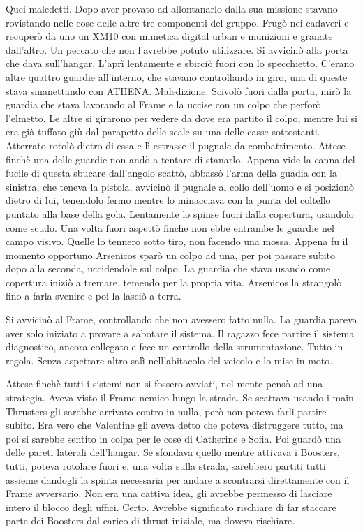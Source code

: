     Quei maledetti. Dopo aver provato ad allontanarlo dalla sua missione stavano rovistando nelle cose delle altre tre
    componenti del gruppo. Frugò nei cadaveri e recuperò da uno un XM10 con mimetica digital urban e munizioni e granate
    dall'altro. Un peccato che non l'avrebbe potuto utilizzare. Si avvicinò alla porta che dava sull'hangar. L'aprì
    lentamente e sbirciò fuori con lo specchietto. C'erano altre quattro guardie all'interno, che stavano controllando
    in giro, una di queste stava smanettando con ATHENA. Maledizione. Scivolò fuori dalla porta, mirò la guardia che
    stava lavorando al Frame e la uccise con un colpo che perforò l'elmetto. Le altre si girarono per vedere da dove era
    partito il colpo, mentre lui si era già tuffato giù dal parapetto delle scale su una delle casse sottostanti.
    Atterrato rotolò dietro di essa e lì estrasse il pugnale da combattimento. Attese finchè una delle guardie non andò
    a tentare di stanarlo. Appena vide la canna del fucile di questa sbucare dall'angolo scattò, abbassò l'arma della
    guadia con la sinistra, che teneva la pistola, avvicinò il pugnale al collo dell'uomo e si posizionò dietro di lui,
    tenendolo fermo mentre lo minacciava con la punta del coltello puntato alla base della gola. Lentamente lo spinse
    fuori dalla copertura, usandolo come scudo. Una volta fuori aspettò finche non ebbe entrambe le guardie nel campo
    visivo. Quelle lo tennero sotto tiro, non facendo una mossa. Appena fu il momento opportuno Arsenicos sparò un colpo
    ad una, per poi passare subito dopo alla seconda, uccidendole sul colpo. La guardia che stava usando come copertura
    iniziò a tremare, temendo per la propria vita. Arsenicos la strangolò fino a farla svenire e poi la lasciò a terra.

    Si avvicinò al Frame, controllando che non avessero fatto nulla. La guardia pareva aver solo iniziato a provare a
    sabotare il sistema. Il ragazzo fece partire il sistema diagnostico, ancora collegato e fece un controllo della
    strumentazione. Tutto in regola. Senza aspettare altro salì nell'abitacolo del veicolo e lo mise in moto.

    Attese finchè tutti i sistemi non si fossero avviati, nel mente pensò  ad una strategia. Aveva visto il Frame nemico
    lungo la strada. Se scattava usando i main Thrusters gli sarebbe arrivato contro in nulla, però non poteva farli
    partire subito. Era vero che Valentine gli aveva detto che poteva distruggere tutto, ma poi si sarebbe sentito in
    colpa per le cose di Catherine e Sofia. Poi guardò una delle pareti laterali dell'hangar. Se sfondava quello mentre
    attivava i Boosters, tutti, poteva rotolare fuori e, una volta sulla strada, sarebbero partiti tutti assieme
    dandogli la spinta necessaria per andare a scontrarsi direttamente con il Frame avversario. Non era una cattiva
    idea, gli avrebbe permesso di lasciare intero il blocco degli uffici. Certo. Avrebbe significato rischiare di far
    staccare parte dei Boosters dal carico di thrust iniziale, ma doveva rischiare.

